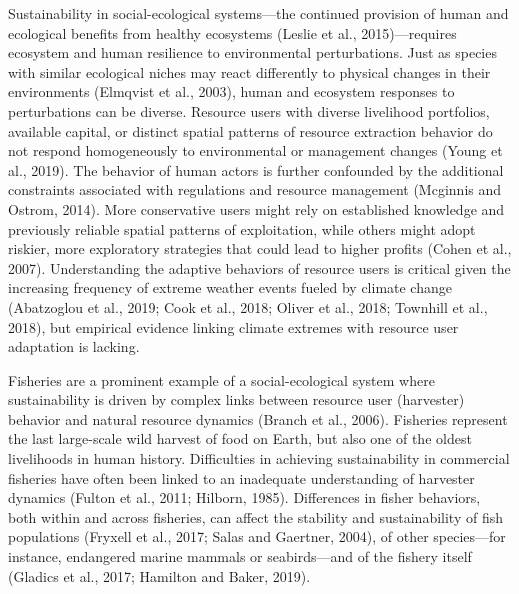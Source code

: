\documentclass[]{elsarticle} %
\begin{document}
Sustainability in social-ecological systems---the continued provision of
human and ecological benefits from healthy ecosystems (Leslie et al.,
2015)---requires ecosystem and human resilience to environmental
perturbations. Just as species with similar ecological niches may react
differently to physical changes in their environments (Elmqvist et al.,
2003), human and ecosystem responses to perturbations can be diverse.
Resource users with diverse livelihood portfolios, available capital, or
distinct spatial patterns of resource extraction behavior do not respond
homogeneously to environmental or management changes (Young et al.,
2019). The behavior of human actors is further confounded by the
additional constraints associated with regulations and resource
management (Mcginnis and Ostrom, 2014). More conservative users might
rely on established knowledge and previously reliable spatial patterns
of exploitation, while others might adopt riskier, more exploratory
strategies that could lead to higher profits (Cohen et al., 2007).
Understanding the adaptive behaviors of resource users is critical given
the increasing frequency of extreme weather events fueled by climate
change (Abatzoglou et al., 2019; Cook et al., 2018; Oliver et al., 2018;
Townhill et al., 2018), but empirical evidence linking climate extremes
with resource user adaptation is lacking.

Fisheries are a prominent example of a social-ecological system where
sustainability is driven by complex links between resource user
(harvester) behavior and natural resource dynamics (Branch et al.,
2006). Fisheries represent the last large-scale wild harvest of food on
Earth, but also one of the oldest livelihoods in human history.
Difficulties in achieving sustainability in commercial fisheries have
often been linked to an inadequate understanding of harvester dynamics
(Fulton et al., 2011; Hilborn, 1985). Differences in fisher behaviors,
both within and across fisheries, can affect the stability and
sustainability of fish populations (Fryxell et al., 2017; Salas and
Gaertner, 2004), of other species---for instance, endangered marine
mammals or seabirds---and of the fishery itself (Gladics et al., 2017;
Hamilton and Baker, 2019).
\end{document}
